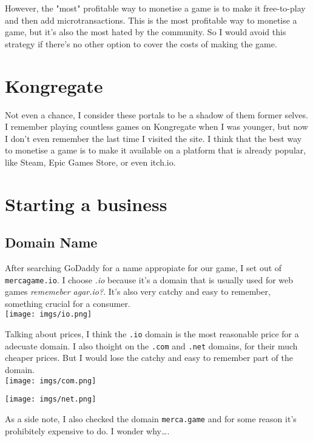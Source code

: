 \documentclass[12pt]{article}
\begin{document}
However, the "most" profitable way to monetise a game is to make it free-to-play and then add microtransactions. This is the most profitable way to monetise a game, but it's also the most hated by the community. So I would avoid this strategy if there's no other option to cover the costs of making the game. 

\section{Kongregate}
Not even a chance, I consider these portals to be a shadow of them former selves. I remember playing countless games on Kongregate when I was younger, but now I don't even remember the last time I visited the site. I think that the best way to monetise a game is to make it available on a platform that is already popular, like Steam, Epic Games Store, or even itch.io.

\newpage
\section{Starting a business}

\subsection{Domain Name}
    After searching GoDaddy for a name appropiate for our game, I set out of \texttt{mercagame.io}. I choose \textit{.io} because it's a domain that is usually used for web games \textit{rememeber agar.io?}. It's also very catchy and easy to remember, something crucial for a consumer.\\

    \texttt{[image: imgs/io.png]}

    Talking about prices, I think the \texttt{.io} domain is the most reasonable price for a adecuate domain. I also thoight on the \texttt{.com} and \texttt{.net} domains, for their much cheaper prices. 
    But I would lose the catchy and easy to remember part of the domain.\\

    \texttt{[image: imgs/com.png]}

    \texttt{[image: imgs/net.png]}

    As a side note, I also checked the domain \texttt{merca.game} and for some reason it's prohibitely expensive to do. I wonder why\dots.\\
\end{document}
